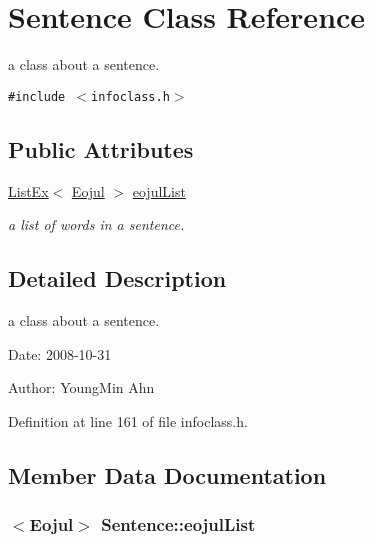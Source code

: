 \hypertarget{classSentence}{
\section{Sentence Class Reference}
\label{classSentence}
}
a class about a sentence.  


{\tt \#include $<$infoclass.h$>$}

\subsection*{Public Attributes}
\begin{CompactItemize}
\item 
\hyperlink{classListEx}{ListEx}$<$ \hyperlink{classkmaOrange_1_1Eojul}{Eojul} $>$ \hyperlink{classSentence_5801c65c1da40219c4d559d5e94f2125}{eojulList}
\begin{CompactList}\small\item\em a list of words in a sentence. \item\end{CompactList}\end{CompactItemize}


\subsection{Detailed Description}
a class about a sentence. 

\begin{Desc}
\item[Date:]2008-10-31 \end{Desc}
\begin{Desc}
\item[Author:]YoungMin Ahn \end{Desc}


Definition at line 161 of file infoclass.h.

\subsection{Member Data Documentation}
\hypertarget{classSentence_5801c65c1da40219c4d559d5e94f2125}{
\subsubsection[{eojulList}]{$<${\bf Eojul}$>$ {\bf Sentence::eojulList}}}
\label{classSentence_5801c65c1da40219c4d559d5e94f2125}


